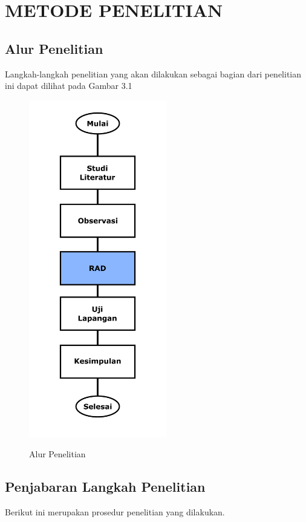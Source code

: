 \chapter{METODE PENELITIAN}

%
\vspace{4.5pt}

\begin{flushleft}
   \begin{justify}
      \section{Alur Penelitian}
      Langkah-langkah penelitian yang akan dilakukan sebagai bagian dari penelitian ini dapat dilihat pada Gambar 3.1
      \begin{figure}[ht]
         \centering
         \includegraphics[width=6cm]{images/alur_penelitian.png}\\
         \caption{Alur Penelitian}
     \end{figure}

      \section{Penjabaran Langkah Penelitian}
       Berikut ini merupakan prosedur penelitian yang dilakukan.

\end{justify}
\end{flushleft}
